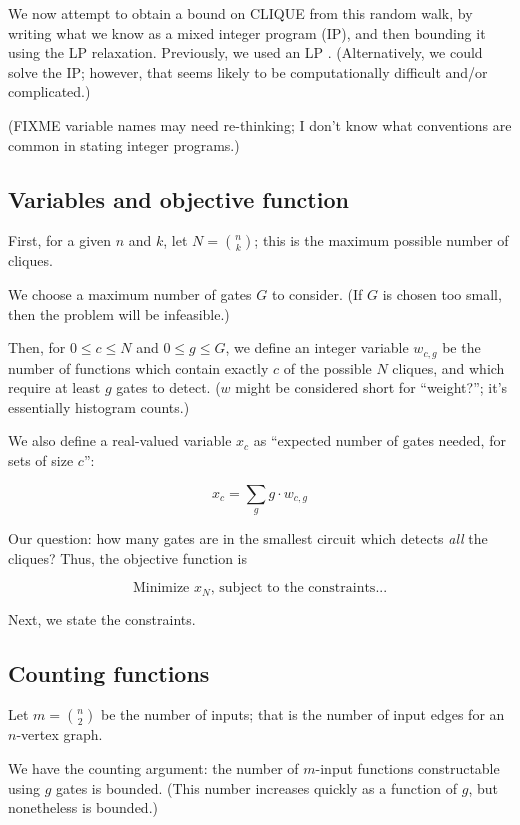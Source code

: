 \documentclass[12pt]{article}
\theoremstyle{definition}
\begin{document}
We now attempt to obtain a bound on CLIQUE from this random walk, by
writing what we know as a mixed integer program (IP), and then bounding it
using the LP relaxation. Previously, we used an LP \cite{buggyclique}.
(Alternatively, we could solve the IP; however, that seems likely to
be computationally difficult and/or complicated.)

(FIXME variable names may need re-thinking; I don't know what
conventions are common in stating integer programs.)

\subsection{Variables and objective function}

First, for a given $n$ and $k$, let $N = {n \choose k}$; this is
the maximum possible number of cliques.

We choose a maximum number of gates $G$ to consider. (If $G$ is
chosen too small, then the problem will be infeasible.)

Then, for $0 \le c \le N$ and $0 \le g \le G$,
we define an integer variable $w_{c,g}$ be the number of functions which contain
exactly $c$ of the possible $N$ cliques, and which require at least
$g$ gates to detect. ($w$ might be considered short for ``weight?'';
it's essentially histogram counts.)

We also define a real-valued variable
$x_c$ as ``expected number of gates needed, for sets of size $c$'':

\[
x_c = \sum_g g \cdot w_{c,g}
\]

Our question: how many gates are in the smallest circuit
which detects {\em all} the cliques? Thus, the objective function
is

\[
\text{Minimize }x_N\text{, subject to the constraints...}
\]

Next, we state the constraints.

\subsection{Counting functions}

Let $m = {n \choose 2}$ be the number of inputs; that is the number
of input edges for an $n$-vertex graph.

We have the counting argument: the number of $m$-input functions
constructable using $g$ gates is bounded. (This number increases
quickly as a function of $g$, but nonetheless is bounded.)
\end{document}
